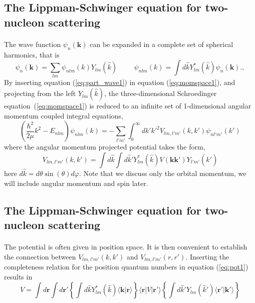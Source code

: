 \documentclass[%
twoside,                 %
final,                   %
10pt]{article}
\begin{document}
\subsection*{The Lippman-Schwinger equation for two-nucleon scattering}

\paragraph{}
The wave function $\psi_n(\mathbf{k})$ can be expanded in a complete set of spherical harmonics, that is
\begin{equation}
  \psi_n(\mathbf{k}) = \sum _{lm} \psi_{nlm}(k)Y_{lm}(\hat{k}) \hspace{1cm} \psi_{nlm}(k) = \int d\hat{k} Y_{lm}^*(\hat{k})\psi_n(\mathbf{k}).   , 
  \label{eq:part_wave1}
\end{equation}
By inserting equation (\ref{eq:part_wave1}) in equation (\ref{eq:momspace1}), and projecting from the left
$Y_{lm}(\hat{k})$, the three-dimensional Schroedinger equation~(\ref{eq:momspace1}) is reduced
to an infinite set of  1-dimensional angular momentum coupled integral equations, 
\begin{equation}
  \left( \frac{\hbar^2}{2\mu} k^2-E_{nlm}\right)\psi_{nlm}(k) = -\sum_{l'm'}\int_{0}^\infty dk' {k'}^2 V_{lm, l'm'}(k,k') \psi_{nl'm'}(k') 
  \label{eq:part_wave2}
\end{equation}
where the angular momentum projected potential takes the form,
\begin{equation}
  V_{lm, l'm'}(k,k') = \int d{\hat{k}} \int d{\hat{k}'}Y_{lm}^*(\hat{k})V(\mathbf{k}\mathbf{k'})Y_{l'm'}(\hat{k}')
  \label{eq:pot1}
\end{equation}
here $d\hat{k} = d\theta\sin(\theta)d\varphi$.
Note that we discuss only the orbital momentum, we will include angular momentum and spin later.



\subsection*{The Lippman-Schwinger equation for two-nucleon scattering}

\paragraph{}

The potential is often given in position space. It is then convenient to establish 
the connection between $V_{lm, l'm'}(k,k')$ and $V_{lm, l'm'}(r,r')$. Inserting 
the completeness relation for the position quantum numbers in equation (\ref{eq:pot1}) results in
\begin{equation}
V =\int d\mathbf{r}\int d\mathbf{r}'\left\{\int d{\hat{k}}Y_{lm}^*(\hat{k})\langle \mathbf{k}\vert \mathbf{r}\rangle\right\}\langle\mathbf{r}\vert V\vert\mathbf{r}'\rangle\left\{\int d\hat{k}'Y_{lm}(\hat{k}')\langle\mathbf{r'}\vert\mathbf{k}'\rangle\right\}
\label{eq:pot2}
\end{equation}
\end{document}
